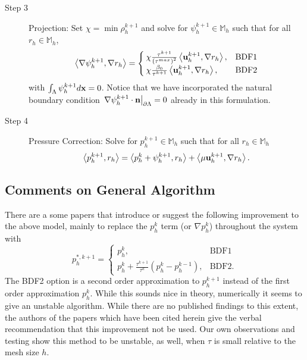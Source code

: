 \documentclass[letterpaper]{erdc}
\begin{document}
\begin{description}
\item[Step 3] Projection: Set $\chi = \min \rho_h^{k+1}$ and solve for $\psi_h^{k+1}\in \mathbb{M}_h$ such that for all $r_h\in \mathbb{M}_h$,
\begin{equation}
 \left\langle \nabla \psi_h^{k+1}, \nabla r_h \right\rangle = \begin{cases} \chi\frac{\tau^{k+1}}{\left(\tau^{max}\right)^2} \left\langle \textbf{u}_h^{k+1}, \nabla r_h \right\rangle, & \mbox{BDF1}\\ \chi\frac{\beta_0}{\tau^{k+1}} \left\langle \textbf{u}_h^{k+1}, \nabla r_h \right\rangle, & \mbox{BDF2} \end{cases}
\end{equation}
with $\int_{\Lambda}\psi_h^{k+1}d\textbf{x} = 0$.  Notice that we have incorporated the natural boundary condition $\left.\nabla\psi_h^{k+1}\cdot\textbf{n}\right|_{\partial\Lambda} = 0 $ already in this formulation.  

\item[Step 4] Pressure Correction: Solve for $p_h^{k+1}\in \mathbb{M}_h$ such that for all $r_h\in \mathbb{M}_h$
\begin{equation}
  \left\langle p_h^{k+1}, r_h \right\rangle = \left\langle p_h^{k} + \psi_h^{k+1}, r_h \right\rangle + \left\langle \mu \textbf{u}_h^{k+1}, \nabla r_h \right\rangle.
\end{equation}
\end{description}

%
%
\subsection{Comments on General Algorithm}
\begin{remark}
There are a some papers that introduce or suggest the following improvement to the above model, mainly to replace the $p^{k}_h$ term (or $\nabla p^{k}_h$) throughout the system with
\begin{equation}
  p_h^{*,k+1} = \begin{cases}
                p_h^{k}, & \mbox{BDF1}\\
                p_h^{k} + \frac{\tau^{k+1}}{\tau^{k}}\left( p_h^k - p_h^{k-1} \right), & \mbox{BDF2}.
                \end{cases}
\end{equation}
The BDF2 option is a second order approximation to $p^{k+1}_h$ instead of the first order approximation $p_h^k$.  While this sounds nice in theory, numerically it seems to give an unstable algorithm.  While there are no published findings to this extent, the authors of the papers which have been cited herein give the verbal recommendation that this improvement not be used.  Our own observations and testing show this method to be unstable, as well, when $\tau$ is small relative to the mesh size $h$.
\end{remark}
\end{document}
